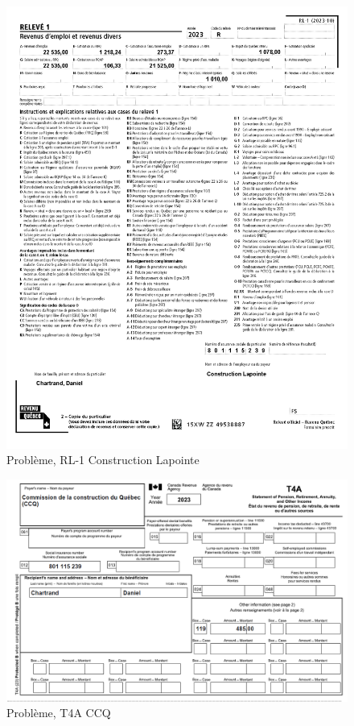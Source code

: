 \begin{figure}
	\centering
	\includegraphics[width=.9\textwidth]{probleme/chapitre-2/RL1-ConstructionLapointe.png}
	\caption{Problème, RL-1 Construction Lapointe}
	\label{fig:pb2RL1ConstructionLapointe}
\end{figure}

\begin{figure}
	\centering
	\includegraphics[width=.9\textwidth]{probleme/chapitre-2/T4A-CCQ.png}
	\caption{Problème, T4A CCQ}
	\label{fig:Chap2T4ACCQ}
\end{figure}

